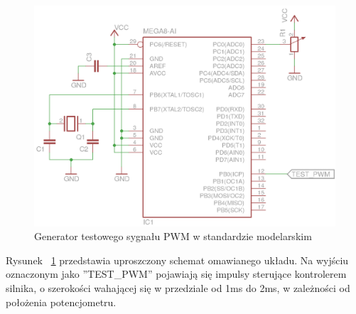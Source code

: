 \begin{figure}[H]
	\centering
	\includegraphics[scale=1]{Pictures/TestSignalGenerator.png}
	\caption[Generator testowego sygnału PWM w standardzie modelarskim]{Generator testowego sygnału PWM w standardzie modelarskim}
	\label{fig:TestSignalGenerator_sch}
\end{figure}

Rysunek ~\ref{fig:TestSignalGenerator_sch} przedstawia uproszczony schemat omawianego układu. Na wyjściu oznaczonym jako ''TEST\_PWM'' pojawiają się impulsy sterujące kontrolerem silnika, o szerokości wahającej się w przedziale od 1ms do 2ms, w zależności od położenia potencjometru.

